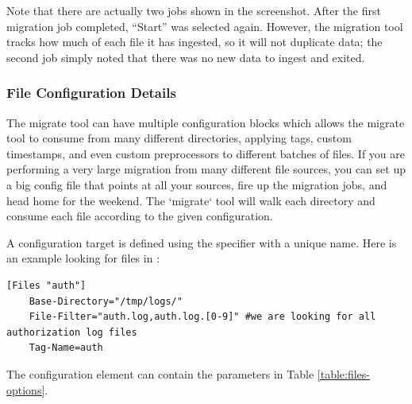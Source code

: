 Note that there are actually two jobs shown in the screenshot. After the first migration job completed, ``Start'' was selected again. However, the migration tool tracks how much of each file it has ingested, so it will not duplicate data; the second job simply noted that there was no new data to ingest and exited.

\clearpage
\subsubsection{File Configuration Details}

The migrate tool can have multiple  configuration blocks which allows the migrate tool to consume from many different directories, applying tags, custom timestamps, and even custom preprocessors to different batches of files.  If you are performing a very large migration from many different file sources, you can set up a big config file that points at all your sources, fire up the migration jobs, and head home for the weekend.  The `migrate` tool will walk each directory and consume each file according to the given configuration.

A  configuration target is defined using the  specifier with a unique name. Here is an example looking for files in :

\begin{verbatim}
[Files "auth"]
	Base-Directory="/tmp/logs/"
	File-Filter="auth.log,auth.log.[0-9]" #we are looking for all authorization log files
	Tag-Name=auth
\end{verbatim}

The  configuration element can contain the parameters in Table \ref{table:files-options}.


